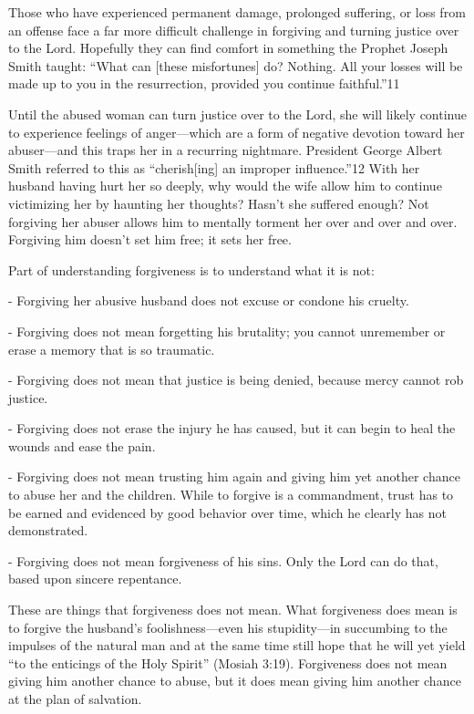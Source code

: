 \documentclass[letterpaper, 11pt]{report}
\begin{document}
Those who have experienced permanent damage, prolonged suffering, or loss from an offense face a far more difficult challenge in forgiving and turning justice over to the Lord. Hopefully they can find comfort in something the Prophet Joseph Smith taught: “What can [these misfortunes] do? Nothing. All your losses will be made up to you in the resurrection, provided you continue faithful.”11

Until the abused woman can turn justice over to the Lord, she will likely continue to experience feelings of anger—which are a form of negative devotion toward her abuser—and this traps her in a recurring nightmare. President George Albert Smith referred to this as “cherish[ing] an improper influence.”12 With her husband having hurt her so deeply, why would the wife allow him to continue victimizing her by haunting her thoughts? Hasn’t she suffered enough? Not forgiving her abuser allows him to mentally torment her over and over and over. Forgiving him doesn’t set him free; it sets her free.

Part of understanding forgiveness is to understand what it is not:

- Forgiving her abusive husband does not excuse or condone his cruelty.

- Forgiving does not mean forgetting his brutality; you cannot unremember or erase a memory that is so traumatic.

- Forgiving does not mean that justice is being denied, because mercy cannot rob justice.


- Forgiving does not erase the injury he has caused, but it can begin to heal the wounds and ease the pain.

- Forgiving does not mean trusting him again and giving him yet another chance to abuse her and the children. While to forgive is a commandment, trust has to be earned and evidenced by good behavior over time, which he clearly has not demonstrated.

- Forgiving does not mean forgiveness of his sins. Only the Lord can do that, based upon sincere repentance.

These are things that forgiveness does not mean. What forgiveness does mean is to forgive the husband’s foolishness—even his stupidity—in succumbing to the impulses of the natural man and at the same time still hope that he will yet yield “to the enticings of the Holy Spirit” (Mosiah 3:19). Forgiveness does not mean giving him another chance to abuse, but it does mean giving him another chance at the plan of salvation.
\end{document}
